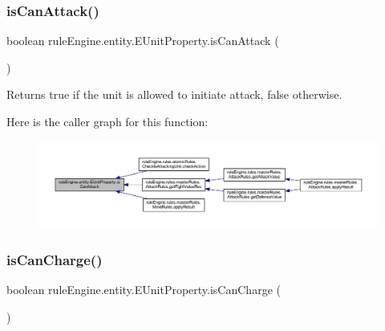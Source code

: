 \subsubsection{\texorpdfstring{is\+Can\+Attack()}{isCanAttack()}}
{\footnotesize\ttfamily boolean rule\+Engine.\+entity.\+E\+Unit\+Property.\+is\+Can\+Attack (\begin{DoxyParamCaption}{ }\end{DoxyParamCaption})\hspace{0.3cm}{\ttfamily [inline]}}

\begin{DoxyReturn}{Returns}
true if the unit is allowed to initiate attack, false otherwise. 
\end{DoxyReturn}
Here is the caller graph for this function\+:
\nopagebreak
\begin{figure}[H]
\begin{center}
\leavevmode
\includegraphics[width=350pt]{enumrule_engine_1_1entity_1_1_e_unit_property_a90937a24e0b60b82124f8d1a1a5b7073_icgraph}
\end{center}
\end{figure}
\mbox{\label{enumrule_engine_1_1entity_1_1_e_unit_property_a546f8e7b0e437729dc8d606f301186aa}} 
\subsubsection{\texorpdfstring{is\+Can\+Charge()}{isCanCharge()}}
{\footnotesize\ttfamily boolean rule\+Engine.\+entity.\+E\+Unit\+Property.\+is\+Can\+Charge (\begin{DoxyParamCaption}{ }\end{DoxyParamCaption})\hspace{0.3cm}{\ttfamily [inline]}}

